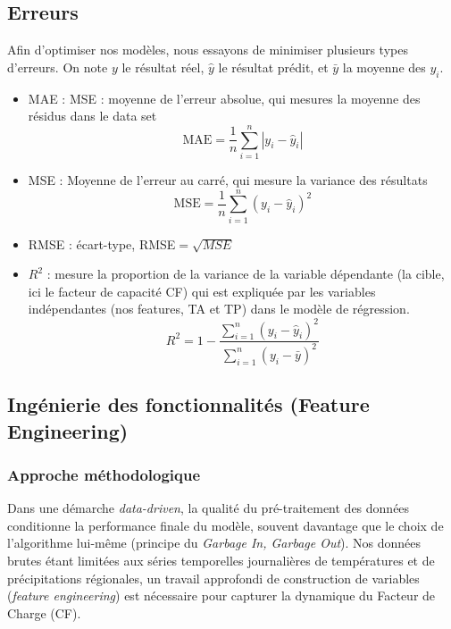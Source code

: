 \documentclass{article}
\theoremstyle{nopointbreak}
\theoremstyle{nobrkbold}
\begin{document}
\subsection{Erreurs}
Afin d'optimiser nos modèles, nous essayons de minimiser plusieurs types d'erreurs. On note $y$ le résultat réel, $\hat{y}$ le résultat prédit, et $\bar{y}$ la moyenne des $y_i$.

\begin{itemize}

    \item MAE : MSE : moyenne de l’erreur absolue, qui mesures la moyenne des résidus dans le data set  $$\text{MAE} = \frac{1}{n} \sum_{i=1}^{n} |y_i - \hat{y}_i|$$
    
    \item MSE : Moyenne de l’erreur au carré, qui mesure la variance des résultats $$ \text{MSE} = \frac{1}{n} \sum_{i=1}^{n} (y_i - \hat{y}_i)^2 $$

    \item RMSE : écart-type, RMSE$= \sqrt{MSE}$

    \item $R^2$ : mesure la proportion de la variance de la variable dépendante (la cible, ici le facteur de capacité CF) qui est expliquée par les variables indépendantes (nos features, TA et TP) dans le modèle de régression.
$$R^2 = 1 - \frac{\sum_{i=1}^{n} (y_i - \hat{y}_i)^2}{\sum_{i=1}^{n} (y_i - \bar{y})^2}$$

\end{itemize}


\subsection{Ingénierie des fonctionnalités (Feature Engineering)}

\subsubsection{Approche méthodologique}

Dans une démarche \textit{data-driven}, la qualité du pré-traitement des données conditionne la performance finale du modèle, souvent davantage que le choix de l'algorithme lui-même (principe du \textit{Garbage In, Garbage Out}). Nos données brutes étant limitées aux séries temporelles journalières de températures et de précipitations régionales, un travail approfondi de construction de variables (\textit{feature engineering}) est nécessaire pour capturer la dynamique du Facteur de Charge (CF).
\end{document}
